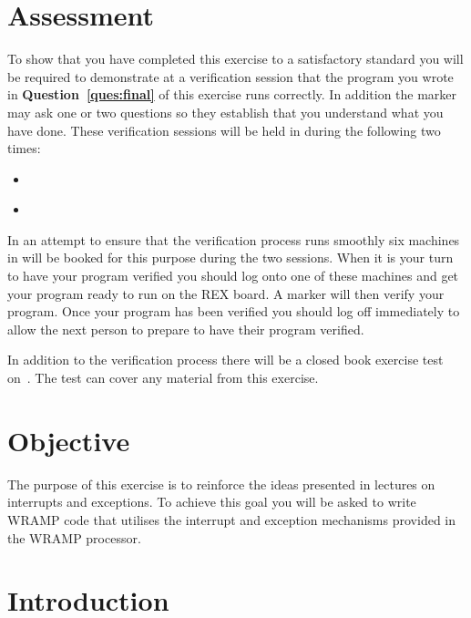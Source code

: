 \documentclass[a4paper,10pt]{article}
\begin{document}


\section{Assessment}

To show that you have completed this exercise to a satisfactory
standard you will be required to demonstrate at a verification session
that the program you wrote in \textbf{Question~\ref{ques:final}} of
this exercise runs correctly. In addition the marker may ask one or
two questions so they establish that you understand what you have
done.  These verification sessions will be held in \ASSESSROOM during the
following two times:

\begin{itemize}
\item \INTERDUE~\MORNINGASSESS
\item \INTERDUE~\AFTERNOONASSESS
\end{itemize}

In an attempt to ensure that the verification process runs smoothly
six machines in \ASSESSROOM will be booked for this purpose during the two
sessions. When it is your turn to have your program verified you
should log onto one of these machines and get your program ready to
run on the REX board. A marker will then verify your program. Once
your program has been verified you should log off immediately to allow
the next person to prepare to have their program verified.

In addition to the verification process there will be a closed book
exercise test on~\textbf{\INTERTEST}. The test can cover any material
from this exercise.

\section{Objective}

The purpose of this exercise is to reinforce the ideas presented in
lectures on interrupts and exceptions. To achieve this goal you will
be asked to write WRAMP code that utilises the interrupt and exception
mechanisms provided in the WRAMP processor.

\section{Introduction}
\end{document}
